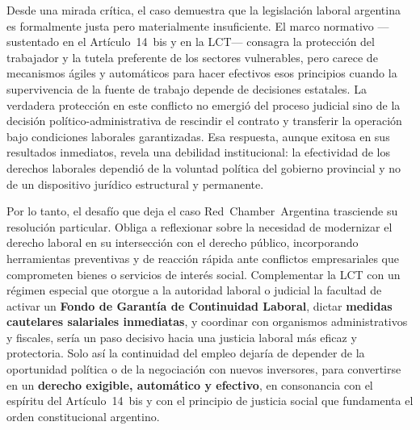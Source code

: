 \documentclass[]{informeutn}
\begin{document}
    Desde una mirada crítica, el caso demuestra que la legislación laboral argentina es formalmente justa pero
    materialmente insuficiente. El marco normativo —sustentado en el Artículo~14~bis y en la LCT— consagra la protección
    del trabajador y la tutela preferente de los sectores vulnerables, pero carece de mecanismos ágiles y automáticos
    para hacer efectivos esos principios cuando la supervivencia de la fuente de trabajo depende de decisiones
    estatales. La verdadera protección en este conflicto no emergió del proceso judicial sino de la decisión
    político-administrativa de rescindir el contrato y transferir la operación bajo condiciones laborales garantizadas.
    Esa respuesta, aunque exitosa en sus resultados inmediatos, revela una debilidad institucional: la efectividad de
    los derechos laborales dependió de la voluntad política del gobierno provincial y no de un dispositivo jurídico
    estructural y permanente.

    Por lo tanto, el desafío que deja el caso Red~Chamber~Argentina trasciende su resolución particular. Obliga a
    reflexionar sobre la necesidad de modernizar el derecho laboral en su intersección con el derecho público,
    incorporando herramientas preventivas y de reacción rápida ante conflictos empresariales que comprometen bienes o
    servicios de interés social. Complementar la LCT con un régimen especial que otorgue a la autoridad laboral o
    judicial la facultad de activar un \textbf{Fondo de Garantía de Continuidad Laboral}, dictar \textbf{medidas
    cautelares salariales inmediatas}, y coordinar con organismos administrativos y fiscales, sería un paso decisivo
    hacia una justicia laboral más eficaz y protectoria. Solo así la continuidad del empleo dejaría de depender de la
    oportunidad política o de la negociación con nuevos inversores, para convertirse en un \textbf{derecho exigible,
    automático y efectivo}, en consonancia con el espíritu del Artículo~14~bis y con el principio de justicia social que
    fundamenta el orden constitucional argentino.
\end{document}
